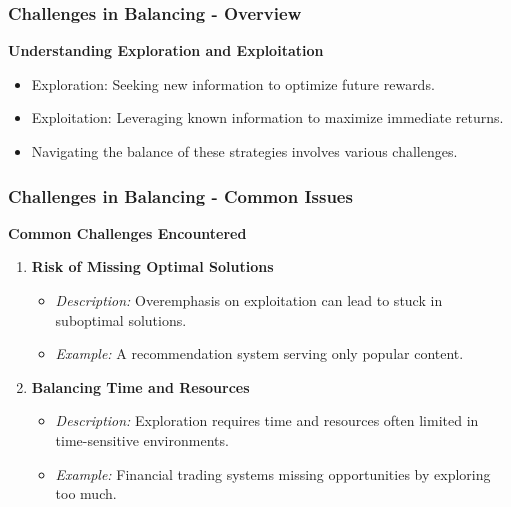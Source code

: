 \documentclass[aspectratio=169]{beamer}
\begin{document}
\begin{frame}[fragile]
    \frametitle{Challenges in Balancing - Overview}
    \textbf{Understanding Exploration and Exploitation}
    
    \begin{itemize}
        \item Exploration: Seeking new information to optimize future rewards.
        \item Exploitation: Leveraging known information to maximize immediate returns.
        \item Navigating the balance of these strategies involves various challenges.
    \end{itemize}
\end{frame}

\begin{frame}[fragile]
    \frametitle{Challenges in Balancing - Common Issues}
    \textbf{Common Challenges Encountered}
    
    \begin{enumerate}
        \item \textbf{Risk of Missing Optimal Solutions}
            \begin{itemize}
                \item \textit{Description:} Overemphasis on exploitation can lead to stuck in suboptimal solutions.
                \item \textit{Example:} A recommendation system serving only popular content.
            \end{itemize}
            
        \item \textbf{Balancing Time and Resources}
            \begin{itemize}
                \item \textit{Description:} Exploration requires time and resources often limited in time-sensitive environments.
                \item \textit{Example:} Financial trading systems missing opportunities by exploring too much.
            \end{itemize}
    \end{enumerate}
\end{frame}
\end{document}
